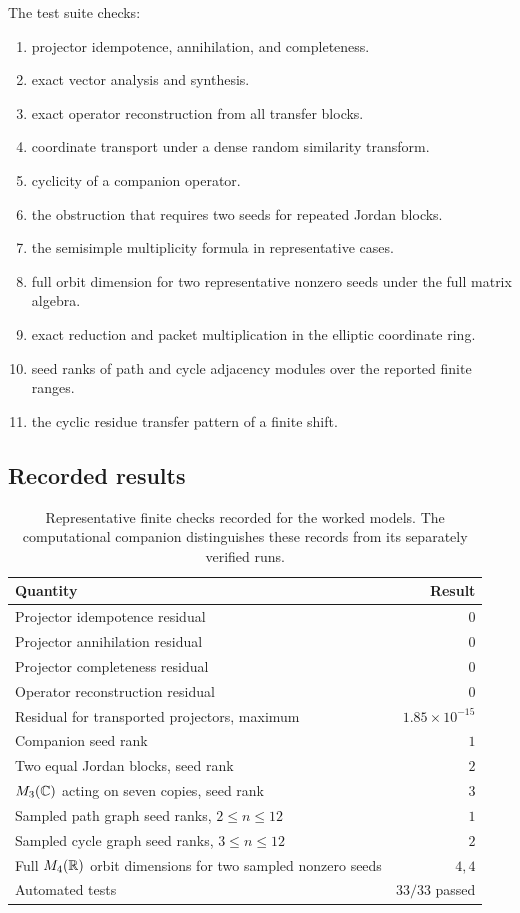 The test suite checks:
\begin{enumerate}[label=(\roman*)]
\item projector idempotence, annihilation, and completeness.
\item exact vector analysis and synthesis.
\item exact operator reconstruction from all transfer blocks.
\item coordinate transport under a dense random similarity transform.
\item cyclicity of a companion operator.
\item the obstruction that requires two seeds for repeated Jordan blocks.
\item the semisimple multiplicity formula in representative cases.
\item full orbit dimension for two representative nonzero seeds under the full matrix algebra.
\item exact reduction and packet multiplication in the elliptic coordinate ring.
\item seed ranks of path and cycle adjacency modules over the reported finite ranges.
\item the cyclic residue transfer pattern of a finite shift.
\end{enumerate}

\subsection{Recorded results}

\begin{table}[htbp]
\centering
\caption{Representative finite checks recorded for the worked models. The computational companion distinguishes these records from its separately verified runs.}
\label{tab:results}
\begin{tabular}{L{0.57\textwidth}r}
\toprule
Quantity & Result \\
\midrule
Projector idempotence residual & $0$ \\
Projector annihilation residual & $0$ \\
Projector completeness residual & $0$ \\
Operator reconstruction residual & $0$ \\
Residual for transported projectors, maximum & $1.85\times10^{-15}$ \\
Companion seed rank & $1$ \\
Two equal Jordan blocks, seed rank & $2$ \\
$M_3(\mathbb C)$ acting on seven copies, seed rank & $3$ \\
Sampled path graph seed ranks, $2\le n\le12$ & $1$ \\
Sampled cycle graph seed ranks, $3\le n\le12$ & $2$ \\
Full $M_4(\mathbb R)$ orbit dimensions for two sampled nonzero seeds & $4,4$ \\
Automated tests & $33/33$ passed \\
\bottomrule
\end{tabular}
\end{table}

